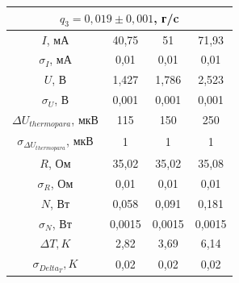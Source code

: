 \documentclass[a4paper, 12pt]{article}%
\begin{document}
\begin{enumerate}
\begin{center}
\begin{tabular}{|c|c|c|c|}
\hline
\multicolumn{4}{|c|}{$q_3 = 0,019 \pm0,001$, г/c} \\ \hline
$I$, мА & 40,75 & 51 & 71,93 \\ \hline
$\sigma_I$, мА & 0,01 & 0,01 & 0,01 \\ \hline
$U$, В & 1,427 & 1,786 & 2,523 \\ \hline
$\sigma_U$, В & 0,001 & 0,001 & 0,001 \\ \hline
$\Delta U_{thermopara}$, мкВ & 115 & 150 & 250 \\ \hline
$\sigma_{\Delta U_{thermopara}}$, мкВ & 1 & 1 & 1 \\ \hline
$R$, Ом & 35,02 & 35,02 & 35,08 \\ \hline
$\sigma_R$, Ом & 0,01 & 0,01 & 0,01 \\ \hline
$N$, Вт & 0,058 & 0,091 & 0,181 \\ \hline
$\sigma_N$, Вт & 0,0015 & 0,0015 & 0,0015 \\ \hline
$\Delta T, K$ & 2,82 & 3,69 & 6,14 \\ \hline
$\sigma_{Delta_T}, K$ & 0,02 & 0,02 & 0,02 \\ \hline
\end{tabular}
\end{center}
\end{enumerate}
\end{document}
